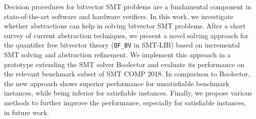 
\Abstract
Decision procedures for bitvector SMT problems are a fundamental component in state-of-the-art software and hardware verifiers.
In this work, we investigate whether abstractions can help in solving bitvector SMT problems.
After a short survey of current abstraction techniques, we present a novel solving approach for the quantifier free bitvector theory (\texttt{QF\_BV} in SMT-LIB) based on incremental SMT solving and abstraction refinement.
We implement this approach in a prototype extending the SMT solver Boolector and evaluate its performance on the relevant benchmark subset of SMT COMP 2018.
In comparison to Boolector, the new approach shows superior performance for unsatisfiable benchmark instances, while being inferior for satisfiable instances.
Finally, we propose various methods to further improve the performance, especially for satisfiable instances, in future work.